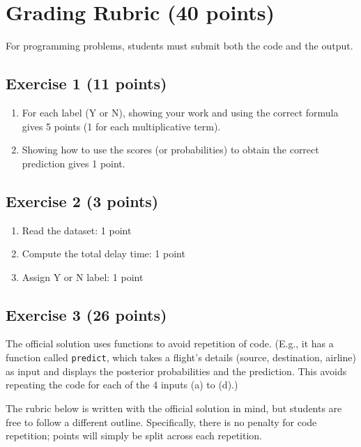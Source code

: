 \documentclass[11pt]{article}
\begin{document}
\newpage
\appendix
\section{Grading Rubric (40 points)}

For programming problems, students must submit both the code and the output.

\subsection{Exercise 1 (11 points)}

\begin{enumerate}
\item For each label (Y or N), showing your work and using the correct formula gives 5 points
    (1 for each multiplicative term).
\item Showing how to use the scores (or probabilities) to obtain the correct prediction gives 1 point.
\end{enumerate}

\subsection{Exercise 2 (3 points)}

\begin{enumerate}
\item Read the dataset: 1 point
\item Compute the total delay time: 1 point
\item Assign Y or N label: 1 point
\end{enumerate}

\subsection{Exercise 3 (26 points)}

The official solution uses functions to avoid repetition of code.
(E.g., it has a function called \texttt{predict}, which takes
a flight's details (source, destination, airline) as input
and displays the posterior probabilities and the prediction.
This avoids repeating the code for each of the 4 inputs (a) to (d).)

The rubric below is written with the official solution in mind,
but students are free to follow a different outline.
Specifically, there is no penalty for code repetition;
points will simply be split across each repetition.
\end{document}
